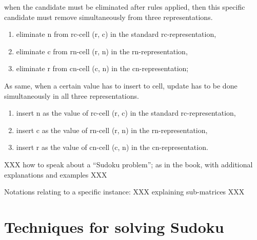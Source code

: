 \documentclass[11pt]{report}
\begin{document}
when the candidate must be eliminated after rules applied, then this specific candidate must remove simultaneously from three representations.
\begin{enumerate}
  \item eliminate n from rc-cell (r, c) in the standard rc-representation,
  \item eliminate c from rn-cell (r, n) in the rn-representation,
  \item eliminate r from cn-cell (c, n) in the cn-representation;
\end{enumerate}
As same, when a certain value has to insert to cell, update has to be done simultaneously in all three representations.
\begin{enumerate}
  \item insert n as the value of rc-cell (r, c) in the standard rc-representation,
  \item insert c as the value of rn-cell (r, n) in the rn-representation,
  \item insert r as the value of cn-cell (c, n) in the cn-representation.
\end{enumerate}

XXX how to speak about a ``Sudoku problem''; as in the book, with additional explanations and examples XXX

Notations relating to a specific instance: XXX explaining sub-matrices XXX








\chapter{Techniques for solving Sudoku}
\label{sec:Techniques}
\end{document}

